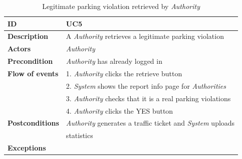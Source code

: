 \documentclass{article}
\begin{document}
\clearpage
\begin{table}
    \begin{center}
    \centering
\begin{tabular}{ | l | l |}
\hline
\textbf{ID} & UC5 \\
\hline
\textbf{Description} & A \textit{Authority} retrieves a legitimate parking violation  \\
\hline
\textbf{Actors} & \textit{Authority} \\
\hline
\textbf{Precondition} & \textit{Authority} has already logged in \\
\hline
\textbf{Flow of events} & 1. \textit{Authority} clicks the retrieve button \\
                        & 2. \textit{System} shows the report info page for \textit{Authorities} \\
                        & 3. \textit{Authority} checks that it is a real parking violations  \\
                        & 4. \textit{Authority} clicks the YES button  \\
\hline
\textbf{Postconditions} &  \textit{Authority} generates a traffic ticket and \textit{System} uploads \\ 
                        & statistics \\
\hline
\textbf{Exceptions} & \\ 
\hline
\end{tabular}
\caption{Legitimate parking violation retrieved by \textit{Authority} }
\end{center}
\end{table}
\end{document}
